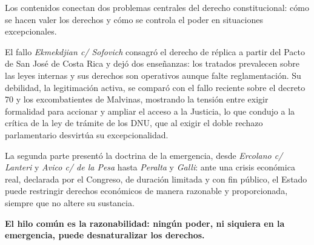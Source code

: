 \documentclass[12pt,oneside]{book}
\begin{document}
Los contenidos conectan dos problemas centrales del derecho constitucional: cómo se hacen valer los derechos y cómo se controla el poder en situaciones excepcionales.

El fallo \textit{Ekmekdjian c/ Sofovich} consagró el derecho de réplica a partir del Pacto de San José de Costa Rica y dejó dos enseñanzas: los tratados prevalecen sobre las leyes internas y sus derechos son operativos aunque falte reglamentación. Su debilidad, la legitimación activa, se comparó con el fallo reciente sobre el decreto 70 y los excombatientes de Malvinas, mostrando la tensión entre exigir formalidad para accionar y ampliar el acceso a la Justicia, lo que condujo a la crítica de la ley de trámite de los DNU, que al exigir el doble rechazo parlamentario desvirtúa su excepcionalidad.

La segunda parte presentó la doctrina de la emergencia, desde \textit{Ercolano c/ Lanteri} y \textit{Avico c/ de la Pesa} hasta \textit{Peralta} y \textit{Galli}: ante una crisis económica real, declarada por el Congreso, de duración limitada y con fin público, el Estado puede restringir derechos económicos de manera razonable y proporcionada, siempre que no altere su sustancia.

\textbf{El hilo común es la razonabilidad: ningún poder, ni siquiera en la emergencia, puede desnaturalizar los derechos.}
\end{document}
